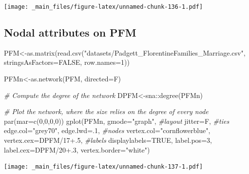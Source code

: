 \documentclass[
  notitlepage,
  onecolumn,
  openany]{book}
\newenvironment{Shaded}{\begin{snugshade}}{\end{snugshade}}
\newcommand{\AttributeTok}[1]{\textcolor[rgb]{0.77,0.63,0.00}{#1}}
\newcommand{\CommentTok}[1]{\textcolor[rgb]{0.56,0.35,0.01}{\textit{#1}}}
\newcommand{\ConstantTok}[1]{\textcolor[rgb]{0.00,0.00,0.00}{#1}}
\newcommand{\DecValTok}[1]{\textcolor[rgb]{0.00,0.00,0.81}{#1}}
\newcommand{\FloatTok}[1]{\textcolor[rgb]{0.00,0.00,0.81}{#1}}
\newcommand{\FunctionTok}[1]{\textcolor[rgb]{0.00,0.00,0.00}{#1}}
\newcommand{\NormalTok}[1]{#1}
\newcommand{\OtherTok}[1]{\textcolor[rgb]{0.56,0.35,0.01}{#1}}
\newcommand{\SpecialCharTok}[1]{\textcolor[rgb]{0.00,0.00,0.00}{#1}}
\newcommand{\StringTok}[1]{\textcolor[rgb]{0.31,0.60,0.02}{#1}}
\begin{document}
\texttt{[image: \_main\_files/figure-latex/unnamed-chunk-136-1.pdf]}

\hypertarget{nodal-attributes-on-pfm}{%
\subsection{Nodal attributes on PFM}\label{nodal-attributes-on-pfm}}

\begin{Shaded}
\begin{Highlighting}[]
\NormalTok{PFM}\OtherTok{\textless{}{-}}\FunctionTok{as.matrix}\NormalTok{(}\FunctionTok{read.csv}\NormalTok{(}\StringTok{"datasets/Padgett\_FlorentineFamilies\_Marriage.csv"}\NormalTok{,}
                        \AttributeTok{stringsAsFactors=}\ConstantTok{FALSE}\NormalTok{, }\AttributeTok{row.names=}\DecValTok{1}\NormalTok{))}

\NormalTok{PFMn}\OtherTok{\textless{}{-}}\FunctionTok{as.network}\NormalTok{(PFM, }\AttributeTok{directed=}\NormalTok{F)}

\CommentTok{\# Compute the degree of the network}
\NormalTok{DPFM}\OtherTok{\textless{}{-}}\NormalTok{sna}\SpecialCharTok{::}\FunctionTok{degree}\NormalTok{(PFMn)}

\CommentTok{\# Plot the network, where the size relies on the degree of every node}
\FunctionTok{par}\NormalTok{(}\AttributeTok{mar=}\FunctionTok{c}\NormalTok{(}\DecValTok{0}\NormalTok{,}\DecValTok{0}\NormalTok{,}\DecValTok{0}\NormalTok{,}\DecValTok{0}\NormalTok{))}
\FunctionTok{gplot}\NormalTok{(PFMn, }
      \AttributeTok{gmode=}\StringTok{"graph"}\NormalTok{, }
      \CommentTok{\#layout}
      \AttributeTok{jitter=}\NormalTok{F,}
      \CommentTok{\#ties}
      \AttributeTok{edge.col=}\StringTok{"grey70"}\NormalTok{,}
      \AttributeTok{edge.lwd=}\NormalTok{.}\DecValTok{1}\NormalTok{, }
      \CommentTok{\#nodes}
      \AttributeTok{vertex.col=}\StringTok{"cornflowerblue"}\NormalTok{,}
      \AttributeTok{vertex.cex=}\NormalTok{DPFM}\SpecialCharTok{/}\DecValTok{17}\FloatTok{+.5}\NormalTok{,}
      \CommentTok{\#labels}
      \AttributeTok{displaylabels=}\ConstantTok{TRUE}\NormalTok{, }
      \AttributeTok{label.pos=}\DecValTok{3}\NormalTok{, }
      \AttributeTok{label.cex=}\NormalTok{DPFM}\SpecialCharTok{/}\DecValTok{20}\FloatTok{+.3}\NormalTok{, }
      \AttributeTok{vertex.border=}\StringTok{"white"}\NormalTok{)}
\end{Highlighting}
\end{Shaded}

\texttt{[image: \_main\_files/figure-latex/unnamed-chunk-137-1.pdf]}
\end{document}
